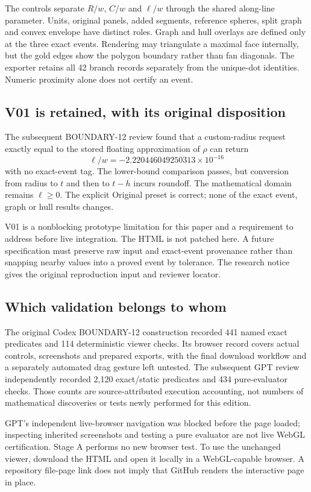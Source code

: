 \documentclass[11pt,a4paper]{article}
\begin{document}
The controls separate $R/w$, $C/w$ and $\ell/w$ through the shared along-line parameter. Units, original panels, added segments, reference spheres, split graph and convex envelope have distinct roles. Graph and hull overlays are defined only at the three exact events. Rendering may triangulate a maximal face internally, but the gold edges show the polygon boundary rather than fan diagonals. The exporter retains all 42 branch records separately from the unique-dot identities. Numeric proximity alone does not certify an event.

\subsection{V01 is retained, with its original disposition}\label{sub:V01}
The subsequent BOUNDARY-12 review found that a custom-radius request exactly equal to the stored floating approximation of $\rho$ can return
\[
\ell/w=-2.220446049250313\times10^{-16}
\]
with no exact-event tag. The lower-bound comparison passes, but conversion from radius to $t$ and then to $t-h$ incurs roundoff. The mathematical domain remains $\ell\geq0$. The explicit Original preset is correct; none of the exact event, graph or hull results changes.

V01 is a nonblocking prototype limitation for this paper and a requirement to address before live integration. The HTML is not patched here. A future specification must preserve raw input and exact-event provenance rather than snapping nearby values into a proved event by tolerance. The research notice gives the original reproduction input and reviewer locator.

\subsection{Which validation belongs to whom}
The original Codex BOUNDARY-12 construction recorded 441 named exact predicates and 114 deterministic viewer checks. Its browser record covers actual controls, screenshots and prepared exports, with the final download workflow and a separately automated drag gesture left untested. The subsequent GPT review independently recorded 2,120 exact/static predicates and 434 pure-evaluator checks. Those counts are source-attributed execution accounting, not numbers of mathematical discoveries or tests newly performed for this edition.

GPT's independent live-browser navigation was blocked before the page loaded; inspecting inherited screenshots and testing a pure evaluator are not live WebGL certification. Stage A performs no new browser test. To use the unchanged viewer, download the HTML and open it locally in a WebGL-capable browser. A repository file-page link does not imply that GitHub renders the interactive page in place.
\end{document}
